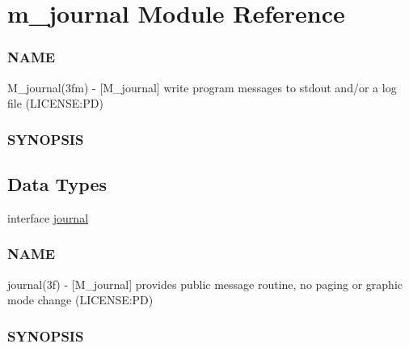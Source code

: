 \hypertarget{namespacem__journal}{}\section{m\+\_\+journal Module Reference}
\label{namespacem__journal}


\subsubsection*{N\+A\+ME}

M\+\_\+journal(3fm) -\/ \mbox{[}M\+\_\+journal\mbox{]} write program messages to stdout and/or a log file (L\+I\+C\+E\+N\+SE\+:PD) \subsubsection*{S\+Y\+N\+O\+P\+S\+IS} 


\subsection*{Data Types}
\begin{DoxyCompactItemize}
\item 
interface \mbox{\hyperlink{interfacem__journal_1_1journal}{journal}}
\begin{DoxyCompactList}\small\item\em \subsubsection*{N\+A\+ME}

journal(3f) -\/ \mbox{[}M\+\_\+journal\mbox{]} provides public message routine, no paging or graphic mode change (L\+I\+C\+E\+N\+SE\+:PD) \subsubsection*{S\+Y\+N\+O\+P\+S\+IS}\end{DoxyCompactList}\end{DoxyCompactItemize}

